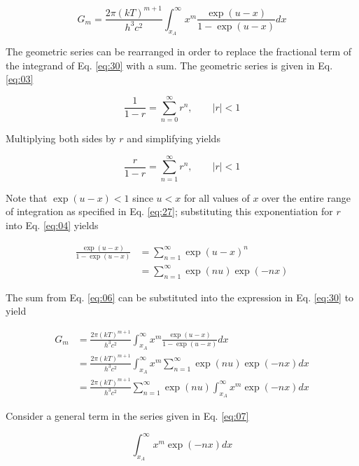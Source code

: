 \documentclass[letterpaper,12pt]{article}
\begin{document}
\begin{equation} \label{eq:30}
G_{m} = \frac{2 \pi (kT)^{m+1}}{h^{3}c^{2}} \int_{x_{A}}^{\infty} x^{m} \frac{\exp(u-x)}{1 - \exp(u-x)} dx
\end{equation}


The geometric series can be rearranged in order to replace the fractional term of the integrand of Eq. \ref{eq:30} with a sum. The geometric series is given in Eq. \ref{eq:03}

\begin{equation} \label{eq:03}
\frac{1}{1-r} = \sum_{n = 0}^{\infty} r^{n}, \qquad |r| < 1
\end{equation}

\noindent Multiplying both sides by $r$ and simplifying yields

\begin{equation} \label{eq:04}
\frac{r}{1-r} = \sum_{n = 1}^{\infty} r^{n}, \qquad |r| < 1
\end{equation}


Note that $\exp(u-x) < 1$ since $u < x$ for all values of $x$ over the entire range of integration as specified in Eq. \ref{eq:27}; substituting this exponentiation for $r$ into Eq. \ref{eq:04} yields

\begin{align} \label{eq:06}
\frac{\exp(u-x)}{1 - \exp(u-x)} &= \sum_{n = 1}^{\infty} \exp(u-x)^{n} \nonumber \\
 &= \sum_{n = 1}^{\infty} \exp(nu) \exp(-nx)
\end{align}


The sum from Eq. \ref{eq:06} can be substituted into the expression in Eq. \ref{eq:30} to yield

\begin{align} \label{eq:07}
G_{m} &= \frac{2\pi (kT)^{m+1}}{h^{3} c^{2}} \int_{x_{A}}^{\infty} x^{m} \frac{\exp(u-x)}{1 - \exp(u-x)} dx \nonumber \\
 &= \frac{2\pi (kT)^{m+1}}{h^{3} c^{2}} \int_{x_{A}}^{\infty} x^{m} \sum_{n = 1}^{\infty} \exp(nu) \exp(-nx) dx \nonumber \\
 &= \frac{2\pi (kT)^{m+1}}{h^{3} c^{2}} \sum_{n = 1}^{\infty} \exp(nu) \int_{x_{A}}^{\infty} x^{m} \exp(-nx) dx
\end{align}

Consider a general term in the series given in Eq. \ref{eq:07}

\begin{equation} \label{eq:08}
\int_{x_{A}}^{\infty} x^{m} \exp(-nx) dx
\end{equation}
\end{document}
